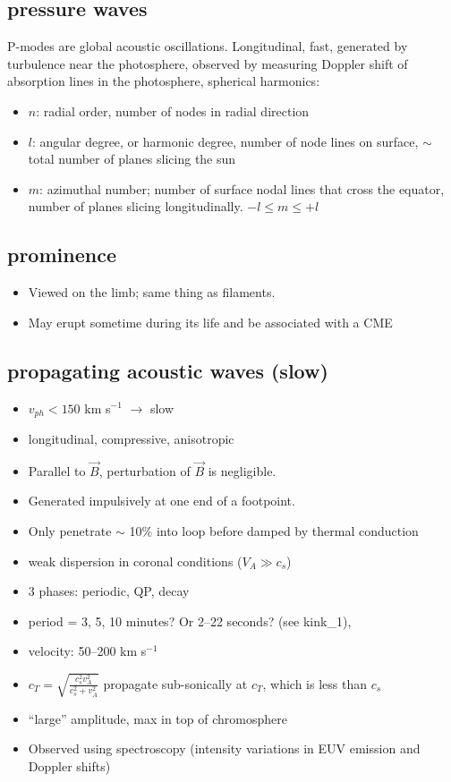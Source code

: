 \documentclass{article}
\begin{document}
\subsection{pressure waves}
P-modes are global acoustic oscillations.
Longitudinal, fast, generated by turbulence near the photosphere,
observed by measuring Doppler shift of absorption lines in the
photosphere, spherical harmonics:
\begin{itemize}
    \item $n$: radial order, number of nodes in radial direction
    \item $l$: angular degree, or harmonic degree,
        number of node lines on surface,
        $\sim$ total number of planes slicing the sun
    \item $m$: azimuthal number;
        number of surface nodal lines that cross the equator,
        number of planes slicing longitudinally. $-l\leq m\leq +l$
\end{itemize}
\subsection{prominence}
    \begin{itemize}
        \item Viewed on the limb; same thing as filaments.
        \item May erupt sometime during its life and be associated
        with a CME
    \end{itemize}
\subsection{propagating acoustic waves (slow)}
\begin{itemize}
    \item $v_{ph}<150$ km s$^{-1}$ $\rightarrow$ slow
    \item longitudinal, compressive, anisotropic
    \item Parallel to $\vec{B}$, perturbation of $\vec{B}$ is negligible.
    \item Generated impulsively at one end of a footpoint.
    \item Only penetrate $\sim$ 10\% into loop before
        damped by thermal conduction
    \item weak dispersion in coronal conditions ($V_{A} \gg c_{s}$)
    \item 3 phases: periodic, QP, decay
    \item period = 3, 5, 10 minutes? Or 2--22 seconds? (see kink\_1),
    \item velocity: 50--200 km s$^{-1}$
    \item $c_{T} = \sqrt{\frac{c_{s}^2v_{A}^2}{c_{s}^2 + v_{A}^2}} $
        propagate sub-sonically at $c_{T}$, which is less than $c_{s}$
    \item ``large'' amplitude, max in top of chromosphere
    \item Observed using spectroscopy (intensity variations in
        EUV emission  and Doppler shifts)
\end{itemize}
\end{document}
